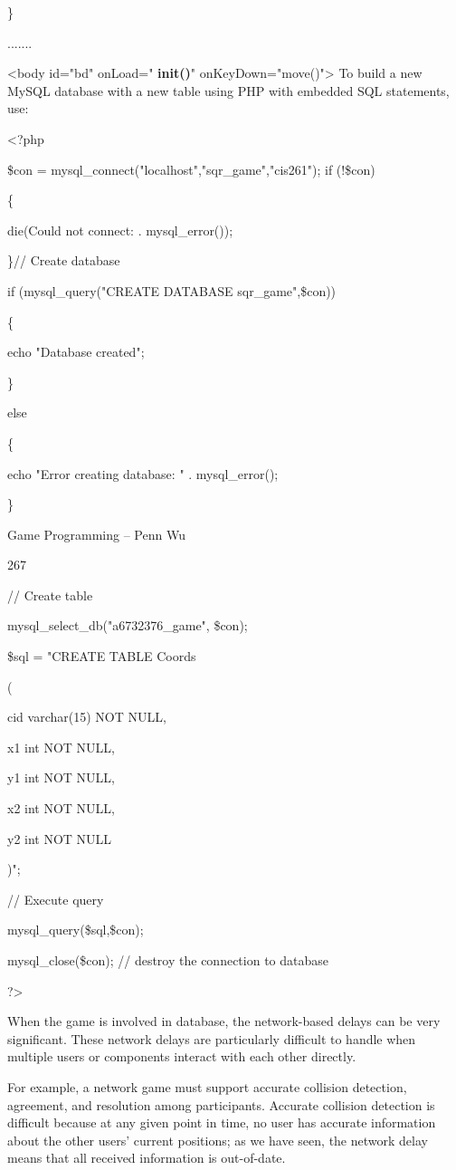 \documentclass[
]{article}
\begin{document}
\}

.......

\textless body id="bd" onLoad=" \textbf{init()}"
onKeyDown="move()"\textgreater{} To build a new MySQL database with a
new table using PHP with embedded SQL statements, use:

\textless?php

\$con = mysql\_connect("localhost","sqr\_game","cis261"); if (!\$con)

\{

die(\textquotesingle Could not connect: \textquotesingle{} .
mysql\_error());

\}// Create database

if (mysql\_query("CREATE DATABASE sqr\_game",\$con))

\{

echo "Database created";

\}

else

\{

echo "Error creating database: " . mysql\_error();

\}

Game Programming -- Penn Wu

267

\protect\hypertarget{index_split_014.htmlux5cux23p268}{}{}// Create
table

mysql\_select\_db("a6732376\_game", \$con);

\$sql = "CREATE TABLE Coords

(

cid varchar(15) NOT NULL,

x1 int NOT NULL,

y1 int NOT NULL,

x2 int NOT NULL,

y2 int NOT NULL

)";

// Execute query

mysql\_query(\$sql,\$con);

mysql\_close(\$con); // destroy the connection to database

?\textgreater{}

When the game is involved in database, the network-based delays can be
very significant. These network delays are particularly difficult to
handle when multiple users or components interact with each other
directly.

For example, a network game must support accurate collision detection,
agreement, and resolution among participants. Accurate collision
detection is difficult because at any given point in time, no user has
accurate information about the other users' current positions; as we
have seen, the network delay means that all received information is
out-of-date.
\end{document}
